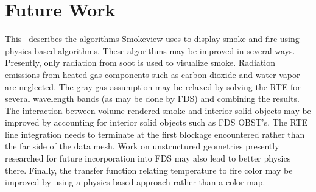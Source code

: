 \section{Future Work}
This \paper\ describes the algorithms Smokeview uses to display smoke and fire using physics based algorithms.  These algorithms may be improved in several ways.  Presently, only radiation from soot is used to visualize smoke.  Radiation emissions from heated gas components such as carbon dioxide and water vapor are neglected.  The gray gas assumption may be relaxed by solving the RTE for several wavelength bands (as may be done by FDS) and combining the results.  The interaction between volume rendered smoke and interior solid objects may be improved by accounting for interior solid objects such as FDS OBST's.  The RTE line integration needs to terminate at the first blockage encountered rather than the far side of the data mesh.  Work on unstructured geometries presently researched for future incorporation into FDS may also lead to better physics there.  Finally, the transfer function relating temperature to fire color may be improved by using a physics based approach rather than a color map.


